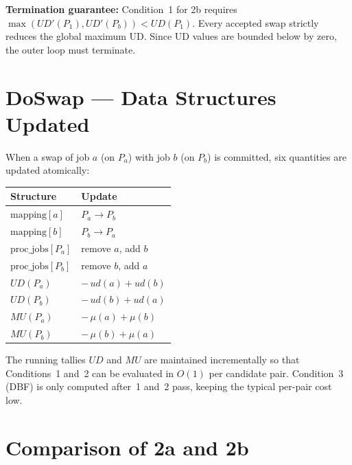 \documentclass[10pt,twocolumn]{article}
\begin{document}
\textbf{Termination guarantee:} Condition~1 for 2b requires
$\max(UD'(P_1), UD'(P_b)) < UD(P_1)$. Every accepted swap strictly
reduces the global maximum UD. Since UD values are bounded below by
zero, the outer loop must terminate.

\section{DoSwap --- Data Structures Updated}

When a swap of job $a$ (on $P_a$) with job $b$ (on $P_b$) is committed,
six quantities are updated atomically:

\begin{center}
\begin{tabular}{ll}
\toprule
\textbf{Structure} & \textbf{Update} \\
\midrule
$\text{mapping}[a]$ & $P_a \to P_b$ \\
$\text{mapping}[b]$ & $P_b \to P_a$ \\
$\text{proc\_jobs}[P_a]$ & remove $a$, add $b$ \\
$\text{proc\_jobs}[P_b]$ & remove $b$, add $a$ \\
$UD(P_a)$ & $-\,ud(a) + ud(b)$ \\
$UD(P_b)$ & $-\,ud(b) + ud(a)$ \\
$MU(P_a)$ & $-\,\mu(a) + \mu(b)$ \\
$MU(P_b)$ & $-\,\mu(b) + \mu(a)$ \\
\bottomrule
\end{tabular}
\end{center}

The running tallies $UD$ and $MU$ are maintained incrementally so that
Conditions~1 and~2 can be evaluated in $O(1)$ per candidate pair.
Condition~3 (DBF) is only computed after~1 and~2 pass, keeping the
typical per-pair cost low.

\section{Comparison of 2a and 2b}
\end{document}
